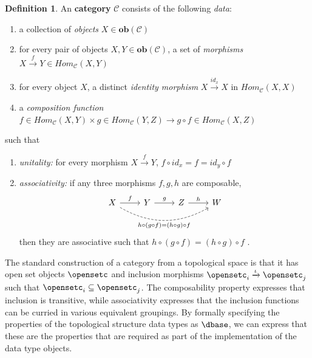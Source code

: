 \documentclass[journal]{IEEEtran}
\theoremstyle{definition}
\newtheorem{definition}{Definition}[section]
\theoremstyle{remark}
\begin{document}
\begin{definition}\label{def:atct:category}
   An \textbf{category} $\mathcal{C}$ consists of the following \textit{data}: 
\begin{enumerate}
  \item a collection of \textit{objects} $X \in \textbf{ob}(\mathcal{C})$
  \item for every pair of objects $X, Y \in \textbf{ob}(\mathcal{C})$, a set of \textit{morphisms} $X \xrightarrow{f} Y \in Hom_{\mathcal{C}}(X, Y)$
  \item for every object $X$, a distinct \textit{identity morphism} $X \xrightarrow {id_x} X$ in $Hom_{\mathcal{C}}(X, X)$
  \item a \textit{composition function} $f \in Hom_{\mathcal{C}}(X, Y) \times  g \in Hom_{\mathcal{C}}(Y, Z) \rightarrow g \circ f \in Hom_{\mathcal{C}}(X, Z)$
\end{enumerate}
such that 
\begin{enumerate}
  \item \textit{unitality:} for every morphism $ X \xrightarrow{f} Y$, $f \circ id_x = f = id_y \circ f$
  \item \textit{associativity:} if any three morphisms $f, g, h$ are composable, 
    \begin{equation*}
      \begin{tikzcd}
        X \arrow[r, "f"] \arrow[rrr, "h\circ(g\circ f) = (h\circ g)\circ f"', bend right, dashed] & Y  \arrow[r, "g"] & Z \arrow[r, "h"] & W
        \end{tikzcd}
  \end{equation*}
  then they are associative such that $h\circ(g\circ f) = (h \circ g) \circ f$  \cite{lawvere2009conceptual,riehlCategoryTheoryContext,maclaneCategoriesWorkingMathematician2013,fongInvitationAppliedCategory2019}. 
  \end{enumerate}
\end{definition}

The standard construction of a category from a topological space is that it has open set objects $\opensetc$ and inclusion morphisms $\opensetc_i \xrightarrow{\iota} \opensetc_j$ such that $\opensetc_i \subseteq \opensetc_j$\cite{riehlCategoryTheoryContext}. The composability property expresses that inclusion is transitive, while associativity expresses that the inclusion functions can be curried in various equivalent groupings. By formally specifying the properties of the topological structure data types as $\mathcal{\dbase}$, we can express that these are the properties that are required as part of the implementation of the data type objects. 
\end{document}

